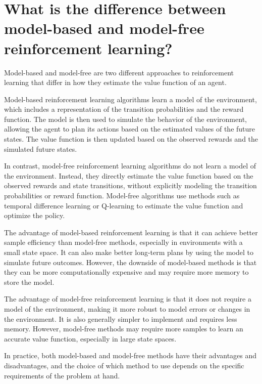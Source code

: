 \section{What is the difference between model-based and model-free reinforcement learning?}
Model-based and model-free are two different approaches to reinforcement learning that differ in how they estimate the value function of an agent.

Model-based reinforcement learning algorithms learn a model of the environment, which includes a representation of the transition probabilities and the reward function. The model is then used to simulate the behavior of the environment, allowing the agent to plan its actions based on the estimated values of the future states. The value function is then updated based on the observed rewards and the simulated future states.

In contrast, model-free reinforcement learning algorithms do not learn a model of the environment. Instead, they directly estimate the value function based on the observed rewards and state transitions, without explicitly modeling the transition probabilities or reward function. Model-free algorithms use methods such as temporal difference learning or Q-learning to estimate the value function and optimize the policy.

The advantage of model-based reinforcement learning is that it can achieve better sample efficiency than model-free methods, especially in environments with a small state space. It can also make better long-term plans by using the model to simulate future outcomes. However, the downside of model-based methods is that they can be more computationally expensive and may require more memory to store the model.

The advantage of model-free reinforcement learning is that it does not require a model of the environment, making it more robust to model errors or changes in the environment. It is also generally simpler to implement and requires less memory. However, model-free methods may require more samples to learn an accurate value function, especially in large state spaces.

In practice, both model-based and model-free methods have their advantages and disadvantages, and the choice of which method to use depends on the specific requirements of the problem at hand.

